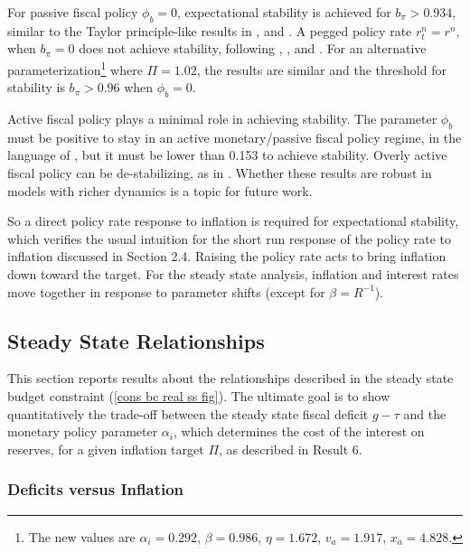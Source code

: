 \documentclass[]{article}
\begin{document}
 For passive fiscal policy $\phi_{b}=0$, expectational stability is achieved for $b_{\pi}>0.934$, similar to the Taylor principle-like results in \textcite{Platanov2024flexpricedeterminacy}, \textcite{bullardmitra02} and \textcite{eusepi2018fiscal}. A pegged policy rate $r^{n}_{t}=r^{n}$, when $b_{\pi}=0$ does not achieve stability, following \textcite{friedman1968role}, \textcite{howitt1992interest}, and \textcite{evans2018interest}. For an alternative parameterization\footnote{The new values are $\alpha_{i} = 0.292$, $\beta = 0.986$, $\eta = 1.672$, $v_{a} = 1.917$, $x_{a} = 4.828$.} where $\Pi=1.02$, the results are similar and the threshold for stability is $b_{\pi}>0.96$ when $\phi_{b}=0$.

Active fiscal policy plays a minimal role in achieving stability. The parameter $\phi_{b}$ must be positive to stay in an active monetary/passive fiscal policy regime, in the language of \textcite{leeper1991active}, but it must be lower than 0.153 to achieve stability. Overly active fiscal policy can be de-stabilizing, as in \textcite{eusepi2018fiscal}. Whether these results are robust in models with richer dynamics is a topic for future work. 

So a direct policy rate response to inflation is required for expectational stability, which verifies the usual intuition for the short run response of the policy rate to inflation discussed in Section 2.4. Raising the policy rate acts to bring inflation down toward the target. For the steady state analysis, inflation and interest rates move together in response to parameter shifts (except for $\beta=R^{-1}$).

\subsection{Steady State Relationships}

This section reports results about the relationships described in the steady state budget constraint (\ref{cons bc real ss fig}). The ultimate goal is to show quantitatively the trade-off between the steady state fiscal deficit $g-\tau$ and the monetary policy parameter $\alpha_{i}$, which determines the cost of the interest on reserves, for a given inflation target $\Pi$, as described in Result 6.

\subsubsection{Deficits versus Inflation}
\end{document}
